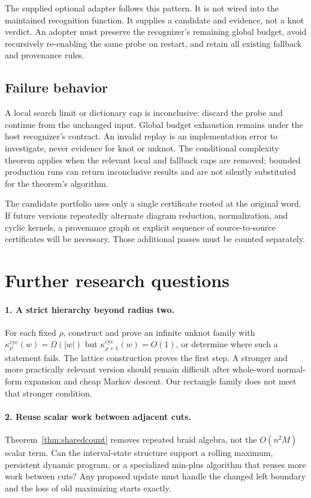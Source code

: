 \documentclass[11pt,a4paper]{article}
\theoremstyle{definition}\newtheorem{definition}[theorem]{Definition}
\theoremstyle{remark}\newtheorem{remark}[theorem]{Remark}
\newcommand{\kc}[1]{\kappa^{\mathrm{cyc}}_{#1}}
\newcommand{\code}[1]{\texttt{\detokenize{#1}}}
\begin{document}
The supplied optional adapter follows this pattern. It is not wired into
the maintained recognition function. It supplies a candidate and evidence,
not a knot verdict. An adopter must preserve the recognizer's remaining global
budget, avoid recursively re-enabling the same probe on restart, and retain
all existing fallback and provenance rules.

\subsection{Failure behavior}
A local search limit or dictionary cap is inconclusive: discard the probe
and continue from the unchanged input. Global budget exhaustion remains
\code{UNKNOWN} under the host recognizer's contract. An invalid replay is
an implementation error to investigate, never evidence for knot or unknot.
The conditional complexity theorem applies when the relevant local and
fallback caps are removed; bounded production runs can return inconclusive
results and are not silently substituted for the theorem's algorithm.

The candidate portfolio uses only a single certificate rooted at the
original word. If future versions repeatedly alternate diagram reduction,
normalization, and cyclic kernels, a provenance graph or explicit sequence
of source-to-source certificates will be necessary. Those additional passes
must be counted separately.

\section{Further research questions}

\paragraph{1. A strict hierarchy beyond radius two.}
For each fixed $\rho$, construct and prove an infinite unknot family with
$\kc{\rho}(w)=\Omega(|w|)$ but $\kc{\rho+1}(w)=O(1)$, or determine where
such a statement fails. The lattice construction proves the first step.
A stronger and more practically relevant version should remain difficult
after whole-word normal-form expansion and cheap Markov descent. Our
rectangle family does not meet that stronger condition.

\paragraph{2. Reuse scalar work between adjacent cuts.}
Theorem~\ref{thm:sharedcount} removes repeated braid algebra, not the
$O(n^2M)$ scalar term. Can the interval-state structure support a rolling
maximum, persistent dynamic program, or a specialized min-plus algorithm
that reuses more work between cuts? Any proposed update must handle the
changed left boundary and the loss of old maximizing starts exactly.
\end{document}
